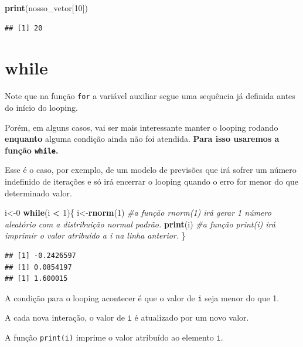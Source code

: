 \documentclass[
]{book}
\newenvironment{Shaded}{\begin{snugshade}}{\end{snugshade}}
\newcommand{\CommentTok}[1]{\textcolor[rgb]{0.56,0.35,0.01}{\textit{#1}}}
\newcommand{\ControlFlowTok}[1]{\textcolor[rgb]{0.13,0.29,0.53}{\textbf{#1}}}
\newcommand{\DecValTok}[1]{\textcolor[rgb]{0.00,0.00,0.81}{#1}}
\newcommand{\KeywordTok}[1]{\textcolor[rgb]{0.13,0.29,0.53}{\textbf{#1}}}
\newcommand{\NormalTok}[1]{#1}
\newcommand{\OperatorTok}[1]{\textcolor[rgb]{0.81,0.36,0.00}{\textbf{#1}}}
\newcommand{\StringTok}[1]{\textcolor[rgb]{0.31,0.60,0.02}{#1}}
\begin{document}
\begin{Shaded}
\begin{Highlighting}[]
\KeywordTok{print}\NormalTok{(nosso_vetor[}\DecValTok{10}\NormalTok{])}
\end{Highlighting}
\end{Shaded}

\begin{verbatim}
## [1] 20
\end{verbatim}

\hypertarget{while}{%
\section{while}\label{while}}

Note que na função \texttt{for} a variável auxiliar segue uma sequência
já definida antes do início do looping.

Porém, em alguns casos, vai ser mais interessante manter o looping
rodando \textbf{enquanto} alguma condição ainda não foi atendida.
\textbf{Para isso usaremos a função \texttt{while}.}

Esse é o caso, por exemplo, de um modelo de previsões que irá sofrer um
número indefinido de iterações e só irá encerrar o looping quando o erro
for menor do que determinado valor.

\begin{Shaded}
\begin{Highlighting}[]
\NormalTok{i<-}\DecValTok{0}
\ControlFlowTok{while}\NormalTok{(i }\OperatorTok{<}\StringTok{ }\DecValTok{1}\NormalTok{)\{}
\NormalTok{  i<-}\KeywordTok{rnorm}\NormalTok{(}\DecValTok{1}\NormalTok{) }\CommentTok{#a função rnorm(1) irá gerar 1 número aleatório com a distribuição normal padrão.}
  \KeywordTok{print}\NormalTok{(i)    }\CommentTok{#a função print(i) irá imprimir o valor atribuído a i na linha anterior.}
\NormalTok{\}}
\end{Highlighting}
\end{Shaded}

\begin{verbatim}
## [1] -0.2426597
## [1] 0.0854197
## [1] 1.600015
\end{verbatim}

A condição para o looping acontecer é que o valor de \texttt{i} seja
menor do que 1.

A cada nova interação, o valor de \texttt{i} é atualizado por um novo
valor.

A função \texttt{print(i)} imprime o valor atribuído ao elemento
\texttt{i}.
\end{document}
